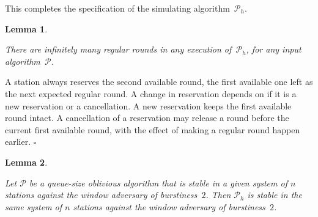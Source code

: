 \documentclass[11pt]{article}
\newcommand{\cP}{\mathcal{P}}
\newcommand{\qed}{\hfill $\square$ \smallbreak}
\newenvironment{proof}{\noindent{\bf Proof:}}{\qed}
\newtheorem{lemma}{Lemma}
\begin{document}
This completes the specification of the simulating algorithm~$\cP_{h}$.




\begin{lemma}
\label{lem:infinitely-regular-rounds}

There are infinitely many regular rounds in any execution of~$\cP_{h}$, for any input  algorithm~$\cP$.
\end{lemma}

\begin{proof}
A station always reserves the second available round, the first available one left as the next expected regular round.
A change in reservation depends on if it is a new reservation or a cancellation.
A new reservation keeps the first available round intact.
A cancellation of a reservation may release a round before the current first available round, with the effect of making a regular round happen earlier.
\end{proof}



\begin{lemma}
\label{lem:h-transformation}

Let $\cP$ be  a queue-size oblivious algorithm that is stable in a given system of $n$ stations against the window adversary of burstiness~$2$.
Then $\cP_h$ is stable in the same system of $n$ stations against the window adversary of burstiness~$2$.
\end{lemma}
\end{document}
